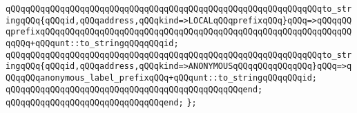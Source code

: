 \verb|qQQqqQQqqQQqqQQqqQQqqQQqqQQqqQQqqQQqqQQqqQQqqQQqqQQqqQQqqQQqqQQqto_stringqQQq{qQQqid,qQQqaddress,qQQqkind=>LOCALqQQqprefixqQQq}qQQq=>qQQqqQQqprefixqQQqqQQqqQQqqQQqqQQqqQQqqQQqqQQqqQQqqQQqqQQqqQQqqQQqqQQqqQQqqQQqqQQq+qQQqunt::to_stringqQQqqQQqid;|\newline
\verb|qQQqqQQqqQQqqQQqqQQqqQQqqQQqqQQqqQQqqQQqqQQqqQQqqQQqqQQqqQQqqQQqto_stringqQQq{qQQqid,qQQqaddress,qQQqkind=>ANONYMOUSqQQqqQQqqQQqqQQq}qQQq=>qQQqqQQqanonymous_label_prefixqQQq+qQQqunt::to_stringqQQqqQQqid;|\newline
\verb|qQQqqQQqqQQqqQQqqQQqqQQqqQQqqQQqqQQqqQQqqQQqqQQqend;|\newline
\verb|qQQqqQQqqQQqqQQqqQQqqQQqqQQqqQQqend;|\newline
\verb|};|\newline
\newline

